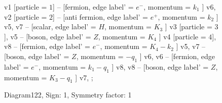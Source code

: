 \documentclass{revtex4}
\begin{document}
\begin{figure}[!htb]
\begin{center}
{    %
v1 [particle = \(1\)] -- [fermion, edge label' = \(e^{-}\), momentum = \(k_{1}\) ] v6, 
v2 [particle = \(2\)] -- [anti fermion, edge label' = \(e^{+}\), momentum = \(k_{2}\) ] v5, 
v7 -- [scalar, edge label' = \(H\), momentum = \(K_{3}\) ] v3 [particle = \(3\)], 
v5 -- [boson, edge label' = \(Z\), momentum = \(K_{4}\) ] v4 [particle = \(4\)], 
v8 -- [fermion, edge label' = \(e^{-}\), momentum = \(K_{4} - k_{2}\) ] v5, 
v7 -- [boson, edge label' = \(Z\), momentum = \(-q_{1}\) ] v6, 
v6 -- [fermion, edge label' = \(e^{-}\), momentum = \(k_{1} - q_{1}\) ] v8, 
v8 -- [boson, edge label' = \(Z\), momentum = \(K_{3} - q_{1}\) ] v7, 
};
\end{center}
\caption{Diagram122, Sign: 1, Symmetry factor: 1}
\end{figure}
\newpage
\end{document}
